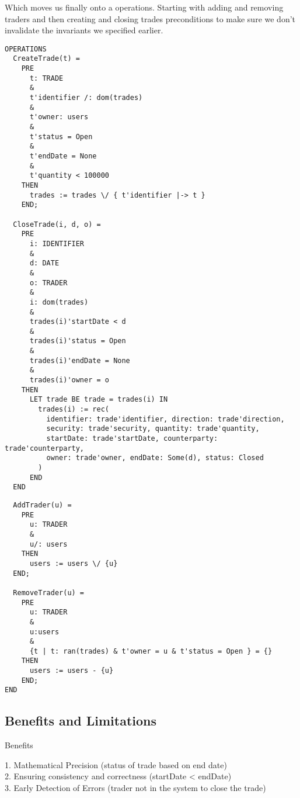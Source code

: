 \documentclass{article}
\begin{document}
\hspace{-0.7cm} Which moves us finally onto a operations. Starting with adding and removing traders and then creating and closing trades preconditions to make sure we don't invalidate the invariants we specified earlier. 
\pagebreak

\begin{verbatim}
OPERATIONS
  CreateTrade(t) =
    PRE
      t: TRADE
      &
      t'identifier /: dom(trades)
      &
      t'owner: users 
      &
      t'status = Open 
      &
      t'endDate = None 
      &
      t'quantity < 100000
    THEN
      trades := trades \/ { t'identifier |-> t }
    END;

  CloseTrade(i, d, o) =
    PRE
      i: IDENTIFIER
      &
      d: DATE
      &
      o: TRADER
      &
      i: dom(trades)
      &
      trades(i)'startDate < d
      &
      trades(i)'status = Open
      &
      trades(i)'endDate = None
      &
      trades(i)'owner = o 
    THEN
      LET trade BE trade = trades(i) IN
        trades(i) := rec(
          identifier: trade'identifier, direction: trade'direction, 
          security: trade'security, quantity: trade'quantity, 
          startDate: trade'startDate, counterparty: trade'counterparty, 
          owner: trade'owner, endDate: Some(d), status: Closed
        )
      END
  END 
\end{verbatim}
\pagebreak

\begin{verbatim}
  AddTrader(u) = 
    PRE
      u: TRADER
      &
      u/: users
    THEN
      users := users \/ {u}
  END;

  RemoveTrader(u) = 
    PRE
      u: TRADER
      &
      u:users
      &
      {t | t: ran(trades) & t'owner = u & t'status = Open } = {}
    THEN
      users := users - {u}
    END;
END
\end{verbatim}

\subsection*{Benefits and Limitations}

Benefits

1. Mathematical Precision (status of trade based on end date) \\
2. Ensuring consistency and correctness (startDate < endDate) \\
3. Early Detection of Errors (trader not in the system to close the trade) \\ 
\end{document}
